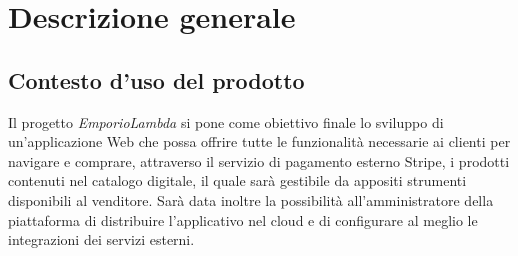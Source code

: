 \section{Descrizione generale}
\subsection{Contesto d'uso del prodotto}
Il progetto \textit{EmporioLambda} si pone come obiettivo finale lo sviluppo di un'applicazione Web che possa offrire tutte le funzionalità necessarie ai clienti per navigare e comprare, attraverso il servizio di pagamento esterno Stripe, i prodotti contenuti nel catalogo digitale, il quale sarà gestibile da appositi strumenti disponibili al venditore. Sarà data inoltre la possibilità all'amministratore della piattaforma di distribuire l'applicativo nel cloud e di configurare al meglio le integrazioni dei servizi esterni.
